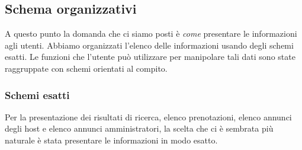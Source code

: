 \documentclass[1_relazione.tex]{subfiles}
\begin{document}
\subsection{Schema organizzativi}
A questo punto la domanda che ci siamo posti \`{e} \textit{come} presentare le informazioni agli utenti. Abbiamo organizzati l'elenco delle informazioni usando degli schemi esatti. Le funzioni che l'utente pu\`{o} utilizzare per manipolare tali dati sono state raggruppate con schemi orientati al compito.

\subsubsection{Schemi esatti}
Per la presentazione dei risultati di ricerca, elenco prenotazioni,  elenco annunci degli host e elenco annunci amministratori, la scelta che ci \`{e} sembrata pi\`{u} naturale \`{e} stata presentare le informazioni in modo esatto.
\end{document}
